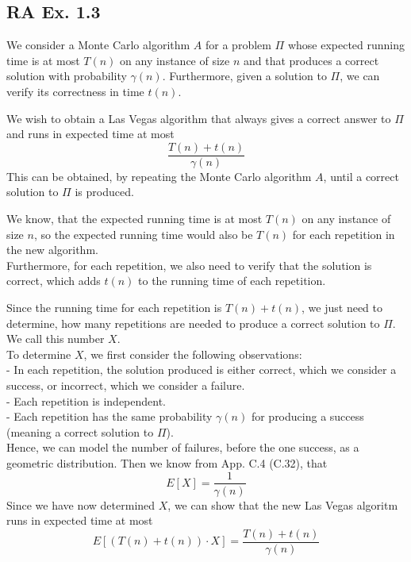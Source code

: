\subsection*{RA Ex. 1.3}
We consider a Monte Carlo algorithm $A$ for a problem $\Pi$ whose expected running time is at most $T(n)$ on any instance of size $n$ and that produces a correct solution with probability $\gamma(n)$. Furthermore, given a solution to $\Pi$, we can verify its correctness in time $t(n)$.

We wish to obtain a Las Vegas algorithm that always gives a correct answer to $\Pi$ and runs in expected time at most
$$
\frac{T(n) + t(n)}{\gamma(n)}
$$
This can be obtained, by repeating the Monte Carlo algorithm $A$, until a correct solution to $\Pi$ is produced.

We know, that the expected running time is at most $T(n)$ on any instance of size $n$, so the expected running time would also be $T(n)$ for each repetition in the new algorithm.
\\
Furthermore, for each repetition, we also need to verify that the solution is correct, which adds $t(n)$ to the running time of each repetition.

Since the running time for each repetition is $T(n) + t(n)$, we just need to determine, how many repetitions are needed to produce a correct solution to $\Pi$. We call this number $X$.
\\
To determine $X$, we first consider the following observations:
\\
- In each repetition, the solution produced is either correct, which we consider a success, or incorrect, which we consider a failure.
\\
- Each repetition is independent.
\\
- Each repetition has the same probability $\gamma(n)$ for producing a success (meaning a correct solution to $\Pi$).
\\
Hence, we can model the number of failures, before the one success, as a geometric distribution. Then we know from App. C.4 (C.32), that
$$
E\left[X\right] = \frac{1}{\gamma(n)}
$$
Since we have now determined $X$, we can show that the new Las Vegas algoritm runs in expected time at most
$$
E\left[\left(T(n) + t(n)\right) \cdot X \right]= \frac{T(n) + t(n)}{\gamma(n)}
$$